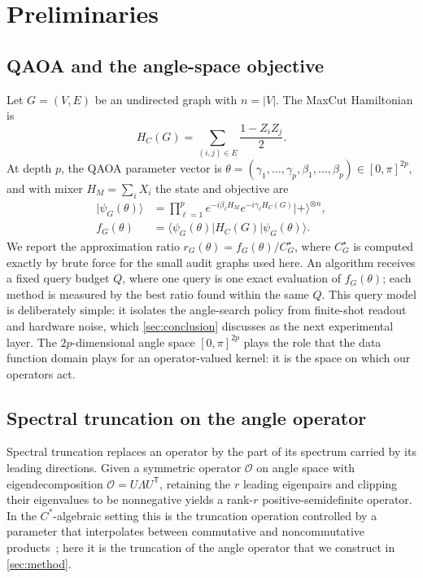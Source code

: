 \documentclass[aps,prresearch,reprint,amsmath,amssymb,floatfix,nofootinbib,superscriptaddress,longbibliography]{revtex4-2}
\theoremstyle{remark}
\newcommand{\calO}{\mathcal{O}}
\begin{document}
\section{Preliminaries}
\label{sec:prelim}

\subsection{QAOA and the angle-space objective}
\label{sec:qaoa}

Let \(G=(V,E)\) be an undirected graph with \(n=|V|\).  The MaxCut Hamiltonian is
\begin{equation}
    H_C(G)=\sum_{(i,j)\in E}\frac{1-Z_iZ_j}{2}.
\end{equation}
At depth \(p\), the QAOA parameter vector is
\(\theta=(\gamma_1,\ldots,\gamma_p,\beta_1,\ldots,\beta_p)\in[0,\pi]^{2p}\),
and with mixer \(H_M=\sum_i X_i\) the state and objective are
\begin{align}
    |\psi_G(\theta)\rangle &=
    \prod_{\ell=1}^{p}e^{-i\beta_\ell H_M}e^{-i\gamma_\ell H_C(G)}
    |+\rangle^{\otimes n}, \\
    f_G(\theta)&=\langle\psi_G(\theta)|H_C(G)|\psi_G(\theta)\rangle .
\end{align}
We report the approximation ratio \(r_G(\theta)=f_G(\theta)/C_G^\star\), where
\(C_G^\star\) is computed exactly by brute force for the small audit graphs used
here.  An algorithm receives a fixed query budget \(Q\), where one query is one
exact evaluation of \(f_G(\theta)\); each method is measured by the best ratio
found within the same \(Q\).  This query model is deliberately simple: it
isolates the angle-search policy from finite-shot readout and hardware noise,
which \cref{sec:conclusion} discusses as the next experimental layer.  The
\(2p\)-dimensional angle space \([0,\pi]^{2p}\) plays the role that the data
function domain plays for an operator-valued kernel: it is the space on which our
operators act.

\subsection{Spectral truncation on the angle operator}
\label{sec:trunc}

Spectral truncation replaces an operator by the part of its spectrum carried by
its leading directions.  Given a symmetric operator \(\calO\) on angle space with
eigendecomposition \(\calO=U\Lambda U^{\mathsf T}\), retaining the \(r\) leading
eigenpairs and clipping their eigenvalues to be nonnegative yields a rank-\(r\)
positive-semidefinite operator.  In the \(C^*\)-algebraic setting this is the
truncation operation controlled by a parameter that interpolates between
commutative and noncommutative products~\cite{hashimoto2024spectral}; here it is
the truncation of the angle operator that we construct in \cref{sec:method}.
\end{document}
